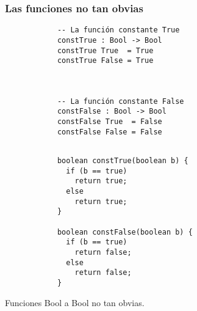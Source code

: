 \documentclass{beamer}
\begin{document}
\begin{frame}[fragile]
  \frametitle{Las funciones no tan obvias}

  \begin{listing}[H]
    \begin{center}
      \begin{minipage}{0.5\textwidth}
          \begin{verbatim}
            -- La función constante True
            constTrue : Bool -> Bool
            constTrue True  = True
            constTrue False = True



            -- La función constante False
            constFalse : Bool -> Bool
            constFalse True  = False
            constFalse False = False


          \end{verbatim}
      \end{minipage}
      \hspace{-0.05\textwidth}
      \vrule
      \hspace{0.025\textwidth}
      \begin{minipage}{0.45\textwidth}
          \begin{verbatim}
            boolean constTrue(boolean b) {
              if (b == true)
                return true;
              else
                return true;
            }

            boolean constFalse(boolean b) {
              if (b == true)
                return false;
              else
                return false;
            }
          \end{verbatim}
      \end{minipage}
    \end{center}
    \caption{Funciones Bool a Bool no tan obvias.}
    \label{lst:btobIdrisJavaNoObvias}
  \end{listing}

\end{frame}
\end{document}
